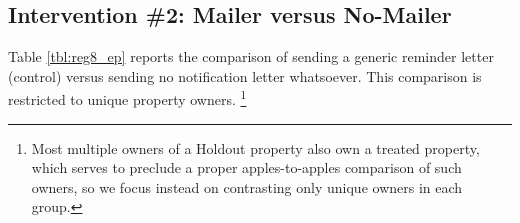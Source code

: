 \documentclass[12pt,titlepage]{article}
\begin{document}

\subsection{Intervention \#2: Mailer versus No-Mailer}

Table \ref{tbl:reg8_ep} reports the comparison of sending a generic reminder letter 
(control) versus sending no notification letter whatsoever. This 
comparison is restricted to unique property owners.
\footnote{
	Most multiple owners of a Holdout property also own a treated property, which
	serves to preclude a proper apples-to-apples comparison of such owners, so
	we focus instead on contrasting only unique owners in each group.
}
\end{document}
